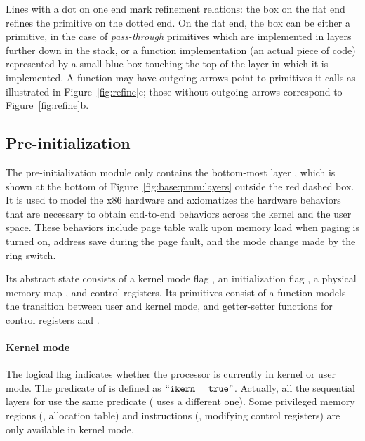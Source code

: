 Lines with a dot on one end mark refinement relations: the box on the
flat end refines the primitive on the dotted end. On the flat end, the
box can be either a primitive, in the case of \emph{pass-through}
primitives which are implemented in layers further down in the stack,
or a function implementation (an actual piece of code) represented by
a small blue box touching the top of the layer in which it is
implemented.  A function may have outgoing arrows point to primitives
it calls as illustrated in Figure\ \ref{fig:refine}c; those without
outgoing arrows correspond to Figure\ \ref{fig:refine}b.

\subsection{Pre-initialization}
\label{sec:base:preinit}
The pre-initialization module only contains the bottom-most layer
, which is shown at the bottom of Figure~\ref{fig:base:pmm:layers} outside the red dashed box. It is used to model the x86 hardware and axiomatizes the
hardware behaviors that are necessary to obtain end-to-end behaviors
across the kernel and the user space. These behaviors include page
table walk upon memory load when paging is turned on, 
address save during the page fault,
and the mode change made by the ring switch.
Its abstract state consists of a kernel mode flag ,
an initialization flag ,
a physical memory map ,
and control registers.
Its primitives consist of
a function models the transition between user and kernel mode,
and 
getter-setter functions for control registers and .

\paragraph{Kernel mode} The logical flag  indicates
whether the processor is currently in kernel or user mode.
The  predicate of 
is defined as $``{\texttt{ikern}} ={\texttt{true}}"$.
Actually, all the sequential layers for \mCTOS{} use the same
  predicate
 (\mCTOShyper{} uses a different one).
Some privileged
memory regions (\eg, allocation table) and 
instructions (\eg, modifying control registers)
are only available in kernel mode.



